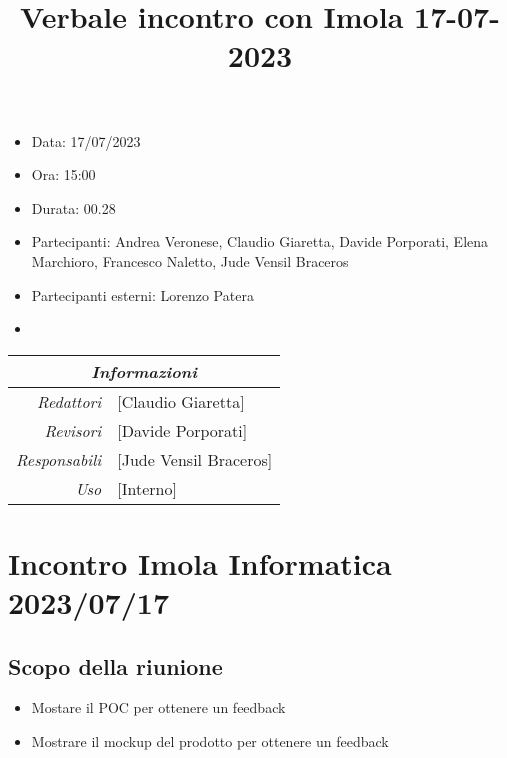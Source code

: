 \documentclass[12pt]{article}
\begin{document}
\graphicspath{ {../../templates/img} }

\title{Verbale incontro con Imola 17-07-2023}
\firstPage
\maketitle

\begin{center}
    \begin{itemize}
        \item[] Data: 17/07/2023
        \item[] Ora: 15:00
        \item[] Durata: 00.28
        \item[] Partecipanti: Andrea Veronese, Claudio Giaretta, Davide Porporati, Elena Marchioro, Francesco Naletto, Jude Vensil Braceros
        \item[] Partecipanti esterni: Lorenzo Patera
        \item[] 
        \end{itemize}
    \begin{tabular}{r | l}
		\multicolumn{2}{c}{\textit{Informazioni}}\\
		\hline
		
			\textit{Redattori} &
			[Claudio Giaretta]\makecell{}\\
		
			\textit{Revisori} &
			[Davide Porporati]\makecell{}\\
			\textit{Responsabili} &
			[Jude Vensil Braceros]\makecell{}\\
		      \textit{Uso} & 
                [Interno]\makecell{}\\
\end{tabular}
\end{center}

\tableofcontents
\printindex
\section{Incontro Imola Informatica 2023/07/17}
\subsection{Scopo della riunione}
\begin{itemize}
    \item Mostare il POC per ottenere un feedback
    \item Mostrare il mockup del prodotto per ottenere un feedback
\end{itemize}
\end{document}
